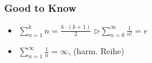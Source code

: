     \subsubsection{Good to Know}
        \vspace{0em}
        \begin{itemize}
            \item $\displaystyle \sum_{n=1}^{k} n = \frac{k \cdot (k + 1)}{2} $ \hspace*{4em} $\triangleright \displaystyle \sum_{n=0}^{\infty} \frac{1}{n!} = e$
            \item $\displaystyle \sum_{n=1}^{\infty} \frac{1}{n} = \infty$, (harm. Reihe)
        \end{itemize}
        